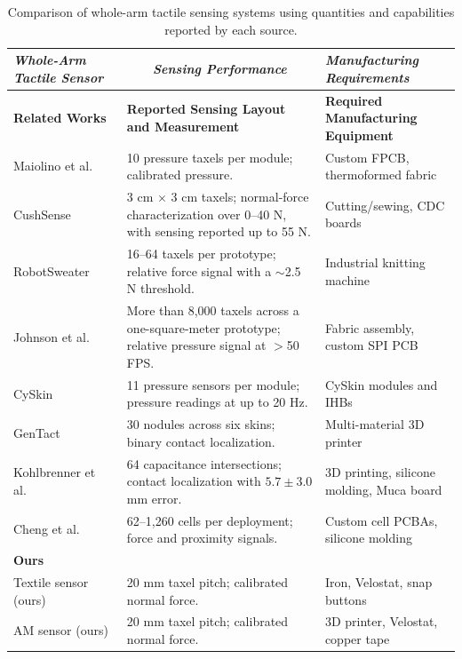 \begin{table}[t]
\centering
\caption{Comparison of whole-arm tactile sensing systems using quantities and capabilities reported by each source.}
\label{tab:related_work_comparison}
\setlength{\tabcolsep}{3pt}
\renewcommand{\arraystretch}{1.18}
\begin{tabularx}{\textwidth}{|p{3.7cm}|X|p{4.8cm}|}
\hline
\textit{\textbf{Whole-Arm Tactile Sensor}} &\multicolumn{1}{c|}{\textit{\textbf{Sensing Performance}}} & \textit{\textbf{Manufacturing Requirements}} \\
\hline
\textbf{Related Works} & \textbf{Reported Sensing Layout and Measurement} & \textbf{Required Manufacturing Equipment} \\
\hline
Maiolino et al.~\cite{6502183}                    & 10 pressure taxels per module; calibrated pressure. & Custom FPCB, thermoformed fabric \\
\hline
CushSense~\cite{10610014}                         & 3 cm $\times$ 3 cm taxels; normal-force characterization over 0--40 N, with sensing reported up to 55 N. & Cutting/sewing, CDC boards \\
\hline
RobotSweater~\cite{si2023robotsweater}            & 16--64 taxels per prototype; relative force signal with a $\sim$2.5 N threshold. & Industrial knitting machine \\
\hline
Johnson et al.~\cite{johnson2025scaling}          & More than 8,000 taxels across a one-square-meter prototype; relative pressure signal at $>$50 FPS. & Fabric assembly, custom SPI PCB \\
\hline
CySkin~\cite{Cyskin}                              & 11 pressure sensors per module; pressure readings at up to 20 Hz. & CySkin modules and IHBs \\
\hline
GenTact~\cite{kohlbrenner2025gentact}             & 30 nodules across six skins; binary contact localization. & Multi-material 3D printer \\
\hline
Kohlbrenner et al.~\cite{kohlbrenner2024machine} & 64 capacitance intersections; contact localization with $5.7\pm3.0$ mm error. & 3D printing, silicone molding, Muca board \\
\hline
Cheng et al.~\cite{8812712}                       & 62--1,260 cells per deployment; force and proximity signals. & Custom cell PCBAs, silicone molding \\
\hline
\multicolumn{3}{|l|}{\textbf{Ours}} \\
\hline
Textile sensor (ours)                             & 20 mm taxel pitch; calibrated normal force. & Iron, Velostat, snap buttons \\
\hline
AM sensor (ours)                                  & 20 mm taxel pitch; calibrated normal force. & 3D printer, Velostat, copper tape \\
\hline
\end{tabularx}
\end{table}

